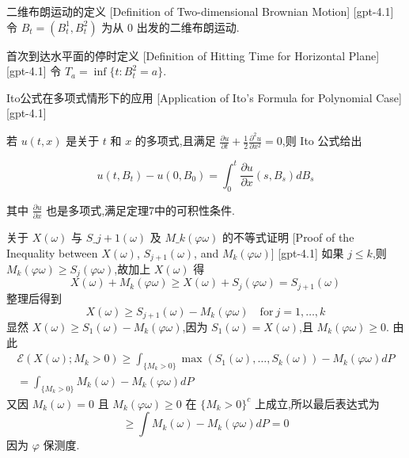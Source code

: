\documentclass[UTF8]{ctexart}
\begin{document}
    
    
    \begin{dfn}
        {二维布朗运动的定义}
        [Definition of Two-dimensional Brownian Motion]
        [gpt-4.1]
        令 $B_{t} = ( B_{t}^{1}, B_{t}^{2} )$ 为从 $0$ 出发的二维布朗运动.
    \end{dfn}
    
    
    
    \begin{dfn}
        {首次到达水平面的停时定义}
        [Definition of Hitting Time for Horizontal Plane]
        [gpt-4.1]
        令 $T_{a} = \operatorname*{inf} \{ t : B_{t}^{2} = a \}$.
    \end{dfn}
    
    
    
    \begin{thm}
        {Ito公式在多项式情形下的应用}
        [Application of Ito's Formula for Polynomial Case]
        [gpt-4.1]
        
若 $u(t, x)$ 是关于 $t$ 和 $x$ 的多项式,且满足 $\frac{\partial u}{\partial t} + \frac{1}{2} \frac{\partial^{2}u}{\partial x^{2}} = 0$,则 Ito 公式给出

\[
u(t, B_{t}) - u(0, B_{0}) = \int_{0}^{t} \frac{\partial u}{\partial x}(s, B_{s}) d B_{s}
\]

其中 $\frac{\partial u}{\partial x}$ 也是多项式,满足定理7中的可积性条件.

    \end{thm}
    
    
    
    \begin{prf}
        {关于 $X(\omega)$ 与 $S\_{j+1}(\omega)$ 及 $M\_{k}(\varphi \omega)$ 的不等式证明}
        [Proof of the Inequality between $X(\omega)$, $S_{j+1}(\omega)$, and $M_{k}(\varphi \omega)$]
        [gpt-4.1]
        如果 $j \le k$,则 $M_{k}(\varphi \omega) \geq S_{j}(\varphi \omega)$,故加上 $X(\omega)$ 得
\[
X(\omega) + M_{k}(\varphi \omega) \geq X(\omega) + S_{j}(\varphi \omega) = S_{j+1}(\omega)
\]
整理后得到
\[
X(\omega) \geq S_{j+1}(\omega) - M_{k}(\varphi \omega) \quad \mathrm{for} \ j = 1, \ldots, k
\]
显然 $X(\omega) \geq S_{1}(\omega) - M_{k}(\varphi \omega)$,因为 $S_{1}(\omega) = X(\omega)$,且 $M_{k}(\varphi \omega) \geq 0$.
由此
\[
\begin{array}{l}
\displaystyle \mathcal{E}(X(\omega); M_{k} > 0) \geq \int_{\{M_{k} > 0\}} \max(S_{1}(\omega), \dots, S_{k}(\omega)) - M_{k}(\varphi \omega) dP \\
\displaystyle = \int_{\{M_{k} > 0\}} M_{k}(\omega) - M_{k}(\varphi \omega) dP
\end{array}
\]
又因 $M_{k}(\omega) = 0$ 且 $M_{k}(\varphi \omega) \geq 0$ 在 $\{M_{k} > 0\}^{c}$ 上成立,所以最后表达式为
\[
\geq \int M_{k}(\omega) - M_{k}(\varphi \omega) dP = 0
\]
因为 $\varphi$ 保测度.

    \end{prf}
    
\end{document}
